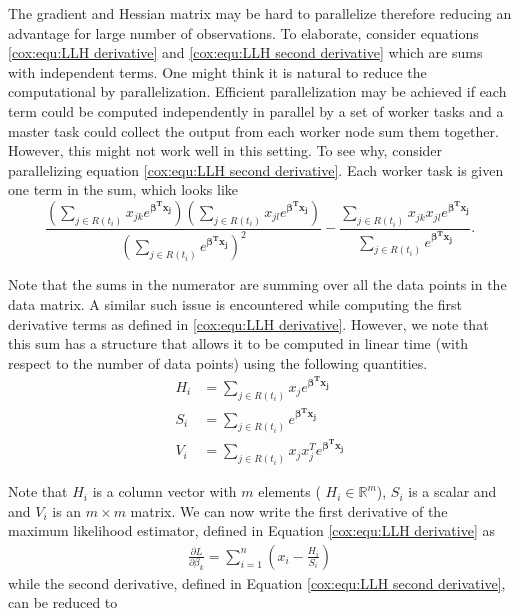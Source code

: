 The gradient and Hessian matrix may be hard to parallelize therefore reducing an
advantage for large number of observations. To elaborate, consider equations
\ref{cox:equ:LLH derivative} and \ref{cox:equ:LLH second derivative} which are
sums with independent terms. One might think it is natural to reduce the
computational by parallelization. Efficient parallelization may be achieved if
each term could be computed independently in parallel by a set of worker tasks
and a master task could collect the output from each worker node sum them
together. However, this might not work well in this setting. To see why,
consider parallelizing equation \ref{cox:equ:LLH second derivative}.  Each
worker task is given one term in the sum, which looks like
\begin{equation}
 \frac{\left(  \sum_{j \in R(t_i)} x_{jk} e^{\mathbf{\beta^T x _j} } \right) \left(  \sum_{j \in R(t_i)} x_{jl} e^{\mathbf{\beta^T x _j} } \right)}{\left( \sum_{j \in R(t_i)} e^{\mathbf{\beta^T x_j} } \right)^2 }   -  \frac{  \sum_{j \in R(t_i)} x_{jk}x_{jl} e^{\mathbf{\beta^T x_j} } }{\sum_{j \in R(t_i)} e^{\mathbf{\beta^T x_j} } }.
\end{equation}

Note that the sums in the numerator are summing over all the data points in the
data matrix. A similar such issue is encountered while computing the first
derivative terms as defined in \ref{cox:equ:LLH derivative}. However, we note
that this sum has a structure that allows it to be computed in linear time (with
respect to the number of data points) using the following quantities.
\begin{align}
H_{i} &=   \sum_{j \in R(t_i)} x_{j} e^{\mathbf{\beta^T x_j}}\\
S_{i}&=   \sum_{j \in R(t_i)} e^{\mathbf{\beta^T x_j}} \\
V_{i}&=   \sum_{j \in R(t_i)} x_{j}x_{j}^T e^{\mathbf{\beta^T x_j} }
\end{align}

Note that $H_{i}$ is a column vector with $m$ elements ( $H_{i}\in
\mathbb{R}^m$), $S_{i}$ is a scalar and and $V_{i}$ is an $m \times m$ matrix.
We can now write the first derivative of the maximum likelihood estimator,
defined in Equation \ref{cox:equ:LLH derivative} as
\begin{align}
\frac{\partial L}{\partial \beta_k} = \sum_{i = 1}^n \left( x_{i} - \frac{H_{i} }{ S_{i}}  \right)
\end{align}
while the second derivative, defined in Equation \ref{cox:equ:LLH second
derivative}, can be reduced to

